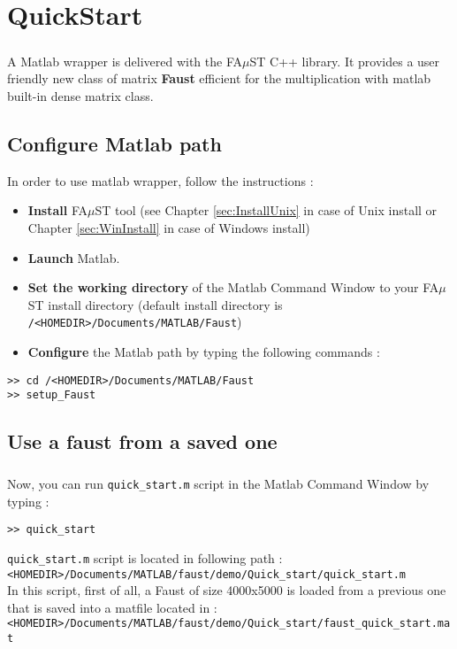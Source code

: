 \chapter{QuickStart}\label{sec:firstUse}


\paragraph{}A Matlab wrapper is delivered with the FA$\mu$ST C++ library.
It provides a user friendly new class of matrix \textbf{Faust} efficient for the multiplication with matlab built-in dense matrix class.\newline

\section{Configure Matlab path}\label{sec:firstUseMatlabPath}
In order to use matlab wrapper, follow the instructions :
\begin{itemize}
\item \textbf{Install} FA$\mu$ST tool (see Chapter \ref{sec:InstallUnix} in case of Unix install or Chapter \ref{sec:WinInstall} in case of Windows install)
\item \textbf{Launch} Matlab.
\item \textbf{Set the working directory} of the Matlab Command Window to your FA$\mu$ST install directory (default install directory is \texttt{/<HOMEDIR>/Documents/MATLAB/Faust})
\item \textbf{Configure} the Matlab path by typing the following commands :
\end{itemize}

\lstset{style=customMatlab}
\begin{lstlisting}
>> cd /<HOMEDIR>/Documents/MATLAB/Faust
>> setup_Faust
\end{lstlisting}



\section{Use a faust from a saved one}\label{sec:firstUseBuildFromSave}
\paragraph{} Now, you can run \texttt{quick\_start.m} script in the Matlab Command Window by typing :
\lstset{style=customMatlab}
\begin{lstlisting}
>> quick_start
\end{lstlisting}
\texttt{quick\_start.m} script is located in following path :\\
\texttt{<HOMEDIR>/Documents/MATLAB/faust/demo/Quick\_start/quick\_start.m} \\
In this script, first of all, a Faust of size 4000x5000 is loaded from a previous one that is saved into a matfile located in :\\
\texttt{<HOMEDIR>/Documents/MATLAB/faust/demo/Quick\_start/faust\_quick\_start.mat}

\newpage
